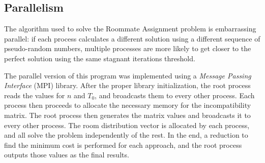 \subsection{Parallelism}
\label{sec:parallelism}
The algorithm used to solve the Roommate Assignment problem is embarrassing parallel: if each process calculates a different solution using a different sequence of pseudo-random numbers, multiple processes are more likely to get closer to the perfect solution using the same stagnant iterations threshold.

The parallel version of this program was implemented using a \textit{Message Passing Interface} (MPI) library. After the proper library initialization, the root process reads the values for $n$ and $T_{0}$, and broadcasts them to every other process. Each process then proceeds to allocate the necessary memory for the incompatibility matrix. The root process then generates the matrix values and broadcasts it to every other process. The room distribution vector is allocated by each process, and all solve the problem independently of the rest. In the end, a reduction to find the minimum cost is performed for each approach, and the root process outputs those values as the final results.